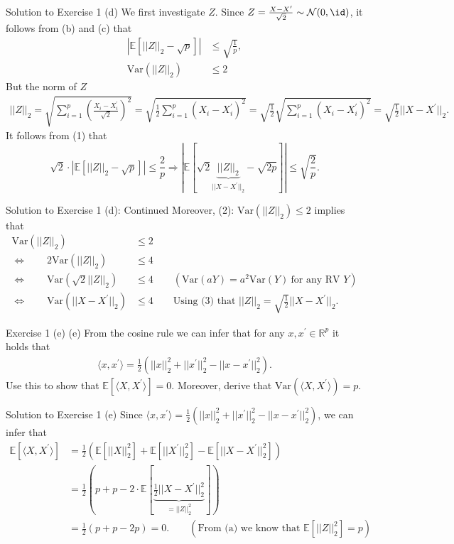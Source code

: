\documentclass[aspectratio=169]{beamer}
\renewcommand{\E}{\mathbb{E}}
\newcommand{\Xnormsq}{||X||_2^2}
\newcommand{\Var}[1]{\mathrm{Var}(#1)}
\newcommand{\sumip}{\sum_{i=1}^p}
\newcommand{\Xp}{X^\prime}
\newcommand{\xp}{x^\prime}
\newcommand{\xnormsq}{||x||_2^2}
\newcommand{\xpnormsq}{||x^\prime||_2^2}
\newcommand{\Xpnormsq}{||X^\prime||_2^2}
\begin{document}
\begin{frame}{Solution to Exercise 1 (d)}
	\small
	We first investigate $Z$. Since $Z = \frac{X - \Xp}{\sqrt{2}} \sim \mathcal{N}(0, \id)$, it follows from (b) and (c) that 
	\begin{align}
		|\E[||Z||_2 - \sqrt{p}]| & \leq \sqrt{\frac{1}{p}},\\
		\Var{||Z||_2} &\leq 2
	\end{align}
	But the norm of $Z$
	\begin{align}
		||Z||_2 = \sqrt{\sumip \left(\frac{X_i - \Xp_i}{\sqrt{2}} \right)^2}  = \sqrt{\frac{1}{2}\sumip (X_i - \Xp_i)^2} = \sqrt{\frac{1}{2}} \sqrt{\sumip (X_i - \Xp_i)^2} = \sqrt{\frac{1}{2}} || X - \Xp ||_2.
	\end{align}
	It follows from (1) that $$ \sqrt{2} \cdot |\E[||Z||_2 - \sqrt{p}]| \leq \frac{2}{p} \Rightarrow |\E[\sqrt{2} \underbrace{||Z||_2}_{||X - \Xp||_2} - \sqrt{2p}]| \leq \sqrt{\frac{2}{p}}.$$
\end{frame}

\begin{frame}{Solution to Exercise 1 (d): Continued}
	Moreover, (2): $\Var{||Z||_2} \leq 2$ implies that
	\begin{align*}
		\Var{||Z||_2} &\leq 2 \\
		\Leftrightarrow \qquad 2 \Var{||Z||_2} &\leq 4 \\
		\Leftrightarrow \qquad  \Var{\sqrt{2} ||Z||_2} & \leq 4 \qquad (\Var{aY} = a^2 \Var{Y} \ \text{for any RV } Y) \\
		\Leftrightarrow \qquad \Var{||X - \Xp||_2} &\leq 4 \qquad \text{Using (3) that } ||Z||_2 = \sqrt{\frac{1}{2}} ||X - \Xp ||_2.
	\end{align*}
\end{frame}

\begin{frame}{Exercise 1 (e)}
	(e) From the cosine rule we can infer that for any $x, \xp \in \mathbb{R}^p$ it holds that 
	\begin{align*}
		\langle x, \xp \rangle = \frac{1}{2} (\xnormsq + \xpnormsq - ||x - \xp ||^2_2 ).
	\end{align*}
	Use this to show that $\E[\langle X, \Xp \rangle] = 0. $ Moreover, derive that $\Var{\langle X, \Xp \rangle} = p$.
\end{frame}

\begin{frame}{Solution to Exercise 1 (e)}
	Since $\langle x, \xp \rangle = \frac{1}{2} (\xnormsq + \xpnormsq - ||x - \xp ||^2_2 )$, we can infer that 
	\begin{align*}
		\E[\langle X, \Xp \rangle] &= \frac{1}{2} (\E[\Xnormsq] + \E[\Xpnormsq] - \E[||X - \Xp ||_2^2]) \\
		&= \frac{1}{2} \left(p + p - 2\cdot \E\left[ \underbrace{\frac{1}{2} ||X - \Xp ||_2^2 }_{= ||Z||_2^2}\right] \right) \\
		&= \frac{1}{2} ( p + p - 2p) = 0. \qquad (\text{From (a) we know that } \E[||Z||_2^2] = p )
	\end{align*}
\end{frame}
\end{document}
